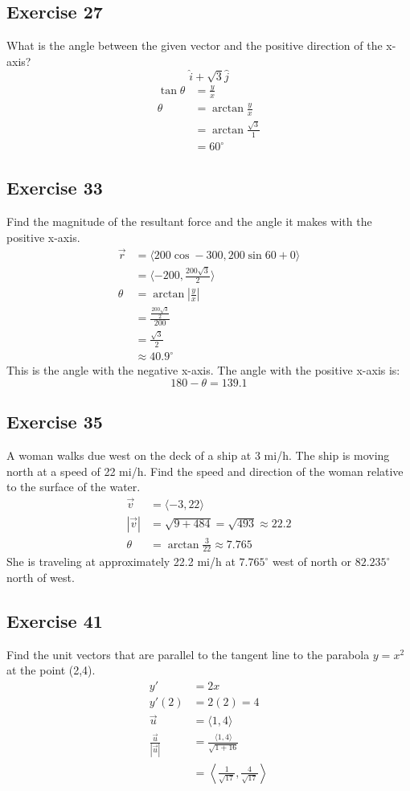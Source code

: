 \documentclass[letterpaper, 12pt]{math}
\begin{document}
\subsection*{Exercise 27}
What is the angle between the given vector and the positive direction of the
x-axis?
\[ \hat{i}+\sqrt{3}\hat{j} \]
\begin{align*}
  \tan\theta &= \frac{y}{x} \\
  \theta &= \arctan\frac{y}{x} \\
  &= \arctan\frac{\sqrt{3}}{1} \\
  &= 60^{\circ}
\end{align*}

\subsection*{Exercise 33}
Find the magnitude of the resultant force and the angle it makes with the
positive x-axis.
\begin{align*}
  \vec{r} &= \langle200\cos-300,200\sin60+0\rangle \\
  &= \langle-200,\frac{200\sqrt{3}}{2}\rangle \\
  \theta &= \arctan|\frac{y}{x}| \\
  &= \frac{\frac{200\sqrt{3}}{2}}{200} \\
  &= \frac{\sqrt{3}}{2} \\
  &\approx 40.9^{\circ}
\end{align*}
This is the angle with the negative x-axis. The angle with the positive x-axis
is:
\[ 180-\theta = 139.1 \]

\subsection*{Exercise 35}
A woman walks due west on the deck of a ship at 3 mi/h. The ship is moving
north at a speed of 22 mi/h. Find the speed and direction of the woman relative
to the surface of the water.
\begin{align*}
  \vec{v} &= \langle-3,22\rangle \\
  |\vec{v}| &= \sqrt{9+484} = \sqrt{493} \approx 22.2 \\
  \theta &= \arctan\frac{3}{22} \approx 7.765
\end{align*}
She is traveling at approximately 22.2 mi/h at \( 7.765^{\circ} \) west of
north or \( 82.235^{\circ} \) north of west.

\subsection*{Exercise 41}
Find the unit vectors that are parallel to the tangent line to the
parabola \( y = x^2 \) at the point (2,4).
\begin{align*}
  y' &= 2x \\
  y'(2) &= 2(2) = 4 \\
  \vec{u} &= \langle1,4\rangle \\
  \frac{\vec{u}}{|\vec{u}|} &= \frac{\langle1,4\rangle}{\sqrt{1+16}} \\
  &= \left\langle\frac{1}{\sqrt{17}},\frac{4}{\sqrt{17}}\right\rangle
\end{align*}
\end{document}
